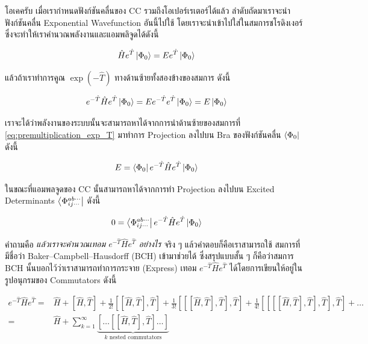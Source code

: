 โอเคครับ เมื่อเรากำหนดฟังก์ชันคลื่นของ CC รวมถึงโอเปอร์เรเตอร์ได้แล้ว ลำดับถัดมาเราจะนำฟังก์ชันคลื่น Exponential Wavefunction อันนี้ไปใช้
โดยเราจะนำเข้าไปใส่ในสมการชโรดิงเงอร์ซึ่งจะทำให้เราคำนวณพลังงานและแอมพลิจูดได้ดังนี้

\begin{equation}
    \hat{H} e^{\hat{T}} \ket{\Phi_0}
    =
    E e^{\hat{T}} \ket{\Phi_0}
\end{equation}

\noindent แล้วถ้าเราทำการคูณ $\exp(-\hat{T})$ ทางด้านซ้ายทั้งสองข้างของสมการ ดังนี้

\begin{equation}
    \label{eq:premultiplication_exp_T}
    e^{-\hat{T}} \hat{H} e^{\hat{T}} \ket{\Phi_0}
    = E e^{-\hat{T}}e^{\hat{T}} \ket{\Phi_0}
    = E \ket{\Phi_0}
\end{equation}

\noindent เราจะได้ว่าพลังงานของระบบนั้นจะสามารถหาได้จากการนำด้านซ้ายของสมการที่ \eqref{eq:premultiplication_exp_T} มาทำการ
Projection ลงไปบน Bra ของฟังก์ชันคลื่น $\bra{\Phi_0}$ ดังนี้

\begin{equation}
    E = \bra{\Phi_0} e^{-\hat{T}} \hat{H} e^{\hat{T}}\ket{\Phi_0}
\end{equation}

\noindent ในขณะที่แอมพลจูดของ CC นั้นสามารถหาได้จากการทำ Projection ลงไปบน Excited Determinants
$\bra{\Phi_{ij\cdots}^{ab\cdots}}$ ดังนี้

\begin{equation}
    0
    =
    \bra{\Phi_{ij\cdots}^{ab\cdots}} e^{-\hat{T}} \hat{H} e^{\hat{T}}\ket{\Phi_0}
\end{equation}

คำถามคือ \textit{แล้วเราจะคำนวณเทอม $e^{-\hat{T}} \hat{H} e^{\hat{T}}$ อย่างไร} จริง ๆ แล้วคำตอบก็คือเราสามารถใช้%
สมการที่มีชื่อว่า Baker--Campbell--Hausdorff (BCH) เข้ามาช่วยได้ ซึ่งสรุปแบบสั้น ๆ ก็คือว่าสมการ BCH นั้นบอกไว้ว่าเราสามารถทำการกระจาย
(Express) เทอม $e^{-\hat{T}} \hat{H} e^{\hat{T}}$ ได้โดยการเขียนให้อยู่ในรูปอนุกรมของ Commutators ดังนี้

\begin{equation}
    \begin{split}
        e^{-\hat{T}} \hat{H} e^{\hat{T}}
        =&
        \hat{H} + [\hat{H},\hat{T}] + \frac{1}{2!} [[\hat{H},\hat{T}],\hat{T}] +
        \frac{1}{3!} [[[\hat{H},\hat{T}],\hat{T}],\hat{T}] +
        \frac{1}{4!} [[[[\hat{H},\hat{T}],\hat{T}],\hat{T}],\hat{T}]  + \ldots \\
        =&
        \hat{H} + \sum_{k=1}^\infty \underbrace{
            [\ldots[[\hat{H},\hat{T}],\hat{T}] \ldots ]
        }_{
            k\text{ nested commutators}
        }
    \end{split}
\end{equation}

